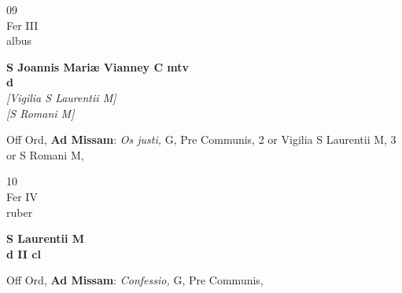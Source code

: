 \documentclass[10pt, openany]{book}
\begin{document}
        \begin{center}
            \begin{minipage}{3.5in}
                \vspace{2em}
                \begin{minipage}{0.5in}
                    {\Huge 09} \\
                    {\normalsize Fer III} \\
                    {\normalsize albus}
                \end{minipage}
                \begin{minipage}{3.0in}
                    \textbf{ \large S Joannis Mariæ Vianney C mtv \\
                    \textnormal{\normalsize d}} \\ \textit{[Vigilia S Laurentii M]} \\ \textit{[S Romani M]} \\ 
                \end{minipage}
                \begin{justify}Off Ord, \textbf{Ad Missam}: \textit{Os justi,} G, Pre Communis, 2 or Vigilia S Laurentii M, 3 or S Romani M,   
                \end{justify}
            \end{minipage}
        \end{center}
    
        \begin{center}
            \begin{minipage}{3.5in}
                \vspace{2em}
                \begin{minipage}{0.5in}
                    {\Huge 10} \\
                    {\normalsize Fer IV} \\
                    {\normalsize ruber}
                \end{minipage}
                \begin{minipage}{3.0in}
                    \textbf{ \large S Laurentii M \\
                    \textnormal{\normalsize d II cl}} \\ 
                \end{minipage}
                \begin{justify}Off Ord, \textbf{Ad Missam}: \textit{Confessio,} G, Pre Communis,   
                \end{justify}
            \end{minipage}
        \end{center}
    
\end{document}
